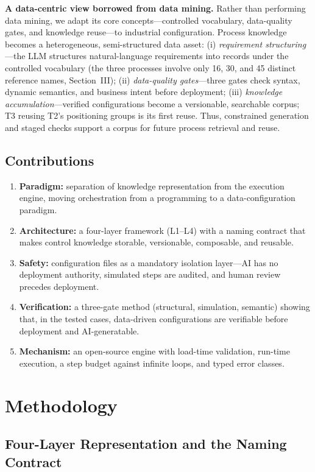 \documentclass[conference]{IEEEtran}
\begin{document}
\textbf{A data-centric view borrowed from data mining.} Rather than performing data mining, we adapt its core concepts---controlled vocabulary, data-quality gates, and knowledge reuse---to industrial configuration. Process knowledge becomes a heterogeneous, semi-structured data asset: (i) \emph{requirement structuring}---the LLM structures natural-language requirements into records under the controlled vocabulary (the three processes involve only 16, 30, and 45 distinct reference names, Section~III); (ii) \emph{data-quality gates}---three gates check syntax, dynamic semantics, and business intent before deployment; (iii) \emph{knowledge accumulation}---verified configurations become a versionable, searchable corpus; T3 reusing T2's positioning groups is its first reuse. Thus, constrained generation and staged checks support a corpus for future process retrieval and reuse.

\subsection{Contributions}

\begin{enumerate}
\item \textbf{Paradigm:} separation of knowledge representation from the execution engine, moving orchestration from a programming to a data-configuration paradigm.
\item \textbf{Architecture:} a four-layer framework (L1--L4) with a naming contract that makes control knowledge storable, versionable, composable, and reusable.
\item \textbf{Safety:} configuration files as a mandatory isolation layer---AI has no deployment authority, simulated steps are audited, and human review precedes deployment.
\item \textbf{Verification:} a three-gate method (structural, simulation, semantic) showing that, in the tested cases, data-driven configurations are verifiable before deployment and AI-generatable.
\item \textbf{Mechanism:} an open-source engine with load-time validation, run-time execution, a step budget against infinite loops, and typed error classes.
\end{enumerate}

\section{Methodology}

\subsection{Four-Layer Representation and the Naming Contract}
\end{document}
